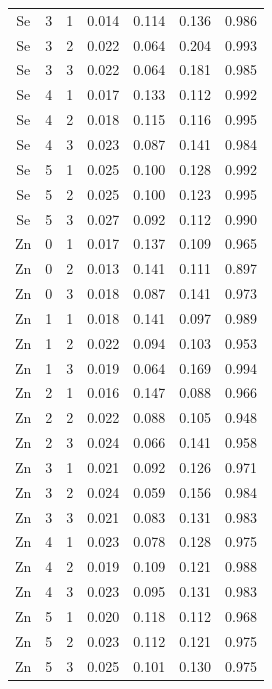 \documentclass[ms, hidelinks]{uncgdissertationexp}
\theoremstyle{plain}
\theoremstyle{definition}
\theoremstyle{remark}
\begin{document}
\begin{longtable}{ccccccc}
Se & 3 & 1 & 0.014 & 0.114 & 0.136 & 0.986\\
\rowcolor{gray!6}  Se & 3 & 2 & 0.022 & 0.064 & 0.204 & 0.993\\
Se & 3 & 3 & 0.022 & 0.064 & 0.181 & 0.985\\
\rowcolor{gray!6}  Se & 4 & 1 & 0.017 & 0.133 & 0.112 & 0.992\\
Se & 4 & 2 & 0.018 & 0.115 & 0.116 & 0.995\\
\rowcolor{gray!6}  Se & 4 & 3 & 0.023 & 0.087 & 0.141 & 0.984\\
Se & 5 & 1 & 0.025 & 0.100 & 0.128 & 0.992\\
\rowcolor{gray!6}  Se & 5 & 2 & 0.025 & 0.100 & 0.123 & 0.995\\
Se & 5 & 3 & 0.027 & 0.092 & 0.112 & 0.990\\
\rowcolor{gray!6}  Zn & 0 & 1 & 0.017 & 0.137 & 0.109 & 0.965\\
Zn & 0 & 2 & 0.013 & 0.141 & 0.111 & 0.897\\
\rowcolor{gray!6}  Zn & 0 & 3 & 0.018 & 0.087 & 0.141 & 0.973\\
Zn & 1 & 1 & 0.018 & 0.141 & 0.097 & 0.989\\
\rowcolor{gray!6}  Zn & 1 & 2 & 0.022 & 0.094 & 0.103 & 0.953\\
Zn & 1 & 3 & 0.019 & 0.064 & 0.169 & 0.994\\
\rowcolor{gray!6}  Zn & 2 & 1 & 0.016 & 0.147 & 0.088 & 0.966\\
Zn & 2 & 2 & 0.022 & 0.088 & 0.105 & 0.948\\
\rowcolor{gray!6}  Zn & 2 & 3 & 0.024 & 0.066 & 0.141 & 0.958\\
Zn & 3 & 1 & 0.021 & 0.092 & 0.126 & 0.971\\
\rowcolor{gray!6}  Zn & 3 & 2 & 0.024 & 0.059 & 0.156 & 0.984\\
Zn & 3 & 3 & 0.021 & 0.083 & 0.131 & 0.983\\
\rowcolor{gray!6}  Zn & 4 & 1 & 0.023 & 0.078 & 0.128 & 0.975\\
Zn & 4 & 2 & 0.019 & 0.109 & 0.121 & 0.988\\
\rowcolor{gray!6}  Zn & 4 & 3 & 0.023 & 0.095 & 0.131 & 0.983\\
Zn & 5 & 1 & 0.020 & 0.118 & 0.112 & 0.968\\
\rowcolor{gray!6}  Zn & 5 & 2 & 0.023 & 0.112 & 0.121 & 0.975\\
Zn & 5 & 3 & 0.025 & 0.101 & 0.130 & 0.975\\*
\end{longtable}
\clearpage
\end{document}
